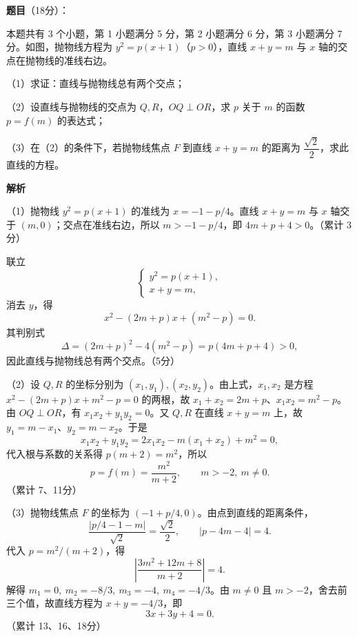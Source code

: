 \begin{answer}

\textbf{题目}（18分）：

本题共有 3 个小题，第 1 小题满分 5 分，第 2 小题满分 6 分，第 3 小题满分 7 分。如图，抛物线方程为 $y^2=p(x+1)$（$p>0$），直线 $x+y=m$ 与 $x$ 轴的交点在抛物线的准线右边。

（1）求证：直线与抛物线总有两个交点；

（2）设直线与抛物线的交点为 $Q,R$，$OQ\perp OR$，求 $p$ 关于 $m$ 的函数 $p=f(m)$ 的表达式；

（3）在（2）的条件下，若抛物线焦点 $F$ 到直线 $x+y=m$ 的距离为 $\dfrac{\sqrt2}{2}$，求此直线的方程。
\nopagebreak[4]
\begin{center}\end{center}
\nopagebreak[4]
\textbf{解析}

（1）抛物线 $y^2=p(x+1)$ 的准线为 $x=-1-p/4$。直线 $x+y=m$ 与 $x$ 轴交于 $(m,0)$；交点在准线右边，所以 $m>-1-p/4$，即 $4m+p+4>0$。（累计 3分）

联立
\nopagebreak[4]
\[\begin{cases}y^2=p(x+1),\\x+y=m,\end{cases}\]
消去 $y$，得
\nopagebreak[4]
\[x^2-(2m+p)x+(m^2-p)=0.\]
其判别式
\nopagebreak[4]
\[\Delta=(2m+p)^2-4(m^2-p)=p(4m+p+4)>0,\]
因此直线与抛物线总有两个交点。（5分）

（2）设 $Q,R$ 的坐标分别为 $(x_1,y_1),(x_2,y_2)$。由上式，$x_1,x_2$ 是方程 $x^2-(2m+p)x+m^2-p=0$ 的两根，故 $x_1+x_2=2m+p$、$x_1x_2=m^2-p$。由 $OQ\perp OR$，有 $x_1x_2+y_1y_2=0$。又 $Q,R$ 在直线 $x+y=m$ 上，故 $y_1=m-x_1$、$y_2=m-x_2$。于是
\nopagebreak[4]
\[x_1x_2+y_1y_2=2x_1x_2-m(x_1+x_2)+m^2=0,\]
代入根与系数的关系得 $p(m+2)=m^2$，所以
\nopagebreak[4]
\[p=f(m)=\frac{m^2}{m+2},\qquad m>-2,\ m\ne0.\]
（累计 7、11分）

（3）抛物线焦点 $F$ 的坐标为 $(-1+p/4,0)$。由点到直线的距离条件，
\nopagebreak[4]
\[\frac{|p/4-1-m|}{\sqrt2}=\frac{\sqrt2}{2},\qquad |p-4m-4|=4.\]
代入 $p=m^2/(m+2)$，得
\nopagebreak[4]
\[\left|\frac{3m^2+12m+8}{m+2}\right|=4.\]
解得 $m_1=0,\ m_2=-8/3,\ m_3=-4,\ m_4=-4/3$。由 $m\ne0$ 且 $m>-2$，舍去前三个值，故直线方程为 $x+y=-4/3$，即
\nopagebreak[4]
\[3x+3y+4=0.\]
（累计 13、16、18分）


\end{answer}
